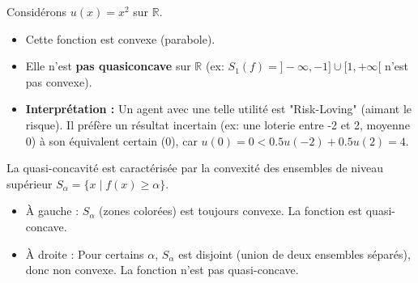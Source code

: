 \begin{exemple}
Considérons $u(x) = x^2$ sur $\mathbb{R}$.
\begin{itemize}
    \item Cette fonction est convexe (parabole).
    \item Elle n'est \textbf{pas quasiconcave} sur $\mathbb{R}$ (ex: $S_1(f) = ]-\infty, -1] \cup [1, +\infty[$ n'est pas convexe).
    \item \textbf{Interprétation :} Un agent avec une telle utilité est "Risk-Loving" (aimant le risque). Il préfère un résultat incertain (ex: une loterie entre -2 et 2, moyenne 0) à son équivalent certain (0), car $u(0)=0 < 0.5 u(-2) + 0.5 u(2) = 4$.
\end{itemize}

\begin{center}
\end{center}
\begin{figureexplanation}
La quasi-concavité est caractérisée par la convexité des ensembles de niveau supérieur $S_\alpha = \{x \mid f(x) \ge \alpha\}$.
\begin{itemize}
    \item À gauche : $S_\alpha$ (zones colorées) est toujours convexe. La fonction est quasi-concave.
    \item À droite : Pour certains $\alpha$, $S_\alpha$ est disjoint (union de deux ensembles séparés), donc non convexe. La fonction n'est pas quasi-concave.
\end{itemize}
\end{figureexplanation}

\end{exemple}

